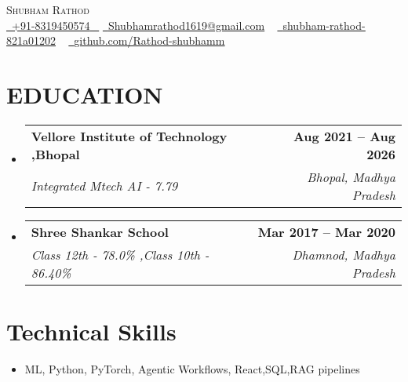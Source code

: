 \documentclass[letterpaper,11pt]{article}
\makeatletter
\newcommand{\resumeSubheading}[4]{
  \vspace{-2pt}\item
    \begin{tabular*}{1.0\textwidth}[t]{l@{\extracolsep{\fill}}r}
      \textbf{\large#1} & \textbf{\small #2} \\
      \textit{\large#3} & \textit{\small #4} \\
      
    \end{tabular*}\vspace{-7pt}
}
\newcommand{\resumeSubHeadingListStart}{\begin{itemize}[leftmargin=0.0in, label={}]}
\newcommand{\resumeSubHeadingListEnd}{\end{itemize}}
\makeatother
\begin{document}


\begin{center}
    {\Huge \scshape Shubham Rathod} \\ \vspace{1pt}
    \small \href{tel:+8319450574}{ \raisebox{-0.1\height}\faPhone\ \underline{+91-8319450574} ~} \href{mailto:Shubhamrathod1619@gmail.com}{\raisebox{-0.2\height}\faEnvelope\  \underline{Shubhamrathod1619@gmail.com}} ~ 
    \href{http://www.linkedin.com/in/shubham-rathod-821a01202/}{\raisebox{-0.2\height}\faLinkedinSquare\ \underline{shubham-rathod-821a01202}}  ~
    \href{https://github.com/Rathod-shubhamm}{\raisebox{-0.2\height}\faGithub\ \underline{github.com/Rathod-shubhamm}} ~
\end{center}


\section{EDUCATION}
  \resumeSubHeadingListStart
    \resumeSubheading
      {Vellore Institute of Technology ,Bhopal}{Aug 2021 -- Aug 2026}
      {Integrated Mtech AI - 7.79  }{Bhopal, Madhya Pradesh}
  \resumeSubHeadingListEnd
  
  \resumeSubHeadingListStart
    \resumeSubheading
      {Shree Shankar School }{Mar 2017 -- Mar 2020}
      {Class 12th  - {78.0\%}  ,Class 10th  - {86.40\%}}{Dhamnod, Madhya Pradesh}
  \resumeSubHeadingListEnd

\section{Technical Skills}
            \begin{itemize}[itemsep=-2pt, parsep=5pt]
                \item ML, Python, PyTorch, Agentic Workflows, React,SQL,RAG pipelines
                \end{itemize}
        \vspace*{2.0\multicolsep}



\end{document}
